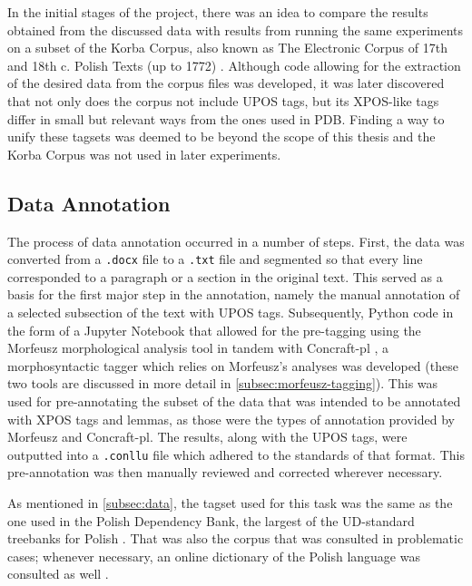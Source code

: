 In the initial stages of the project, there was an idea to compare the results obtained from the discussed data with results from running the same experiments on a subset of the Korba Corpus, also known as The Electronic Corpus of 17th and 18th c. Polish Texts (up to 1772) \citep{korba}. Although code allowing for the extraction of the desired data from the corpus files was developed, it was later discovered that not only does the corpus not include UPOS tags, but its XPOS-like tags differ in small but relevant ways from the ones used in PDB. Finding a way to unify these tagsets was deemed to be beyond the scope of this thesis and the Korba Corpus was not used in later experiments. 

\subsection{Data Annotation}
\label{subsec:annotation}

The process of data annotation occurred in a number of steps. First, the data was converted from a \texttt{.docx} file to a \texttt{.txt} file and segmented so that every line corresponded to a paragraph or a section in the original text. This served as a basis for the first major step in the annotation, namely the manual annotation of a selected subsection of the text with UPOS tags. Subsequently, Python code in the form of a Jupyter Notebook that allowed for the pre-tagging using the Morfeusz morphological analysis tool \citep{kie:wol:17:morf} in tandem with Concraft-pl \citep{waszczuk-2012-harnessing, waszczuk2018morphosyntactic}, a morphosyntactic tagger which relies on Morfeusz's analyses was developed (these two tools are discussed in more detail in \autoref{subsec:morfeusz-tagging}). This was used for pre-annotating the subset of the data that was intended to be annotated with XPOS tags and lemmas, as those were the types of annotation provided by Morfeusz and Concraft-pl. The results, along with the UPOS tags, were outputted into a \texttt{.conllu} file which adhered to the standards of that format. This pre-annotation was then manually reviewed and corrected wherever necessary.

As mentioned in \autoref{subsec:data}, the tagset used for this task was the same as the one used in the Polish Dependency Bank, the largest of the UD-standard treebanks for Polish \citep{wroblewska-2018-extended}. That was also the corpus that was consulted in problematic cases; whenever necessary, an online dictionary of the Polish language was consulted as well \citep{pwn_n.d.}.

